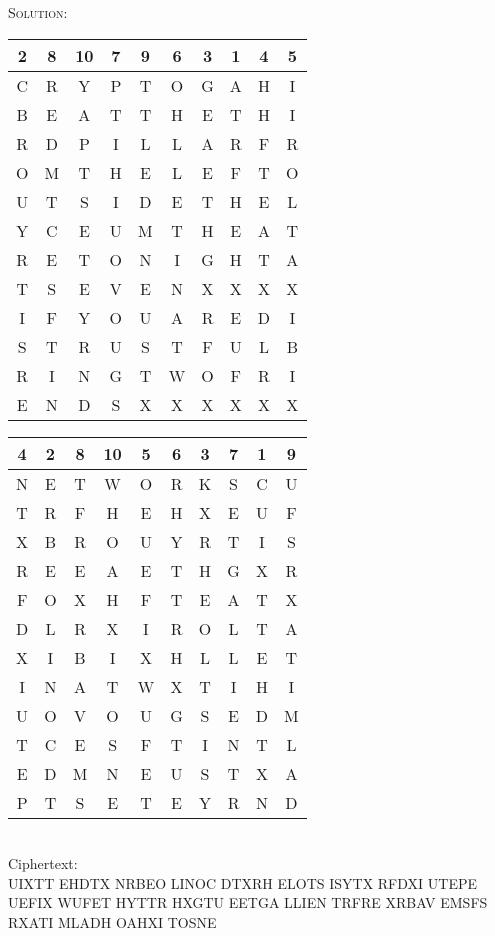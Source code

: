 \documentclass[12pt]{article}
\newenvironment{solution}
    {\textsc{Solution:}\\}
    {\newpage}%
\begin{document}
	\begin{solution}
		\begin{center}
			\begin{tabular}{|c|c|c|c|c|c|c|c|c|c|}
				\hline
				2 & 8 & 10 & 7 & 9 & 6 & 3 & 1 & 4 & 5 \\ \hline
				C & R & Y  & P & T & O & G & A & H & I \\ \hline
				B & E & A  & T & T & H & E & T & H & I \\
				R & D & P  & I & L & L & A & R & F & R \\
				O & M & T  & H & E & L & E & F & T & O \\
				U & T & S  & I & D & E & T & H & E & L \\
				Y & C & E  & U & M & T & H & E & A & T \\
				R & E & T  & O & N & I & G & H & T & A \\
				T & S & E  & V & E & N & X & X & X & X \\
				I & F & Y  & O & U & A & R & E & D & I \\
				S & T & R  & U & S & T & F & U & L & B \\
				R & I & N  & G & T & W & O & F & R & I \\
				E & N & D  & S & X & X & X & X & X & X \\ \hline
			\end{tabular}
			\quad
			\begin{tabular}{|c|c|c|c|c|c|c|c|c|c|}
				\hline
				4 & 2 & 8 & 10 & 5 & 6 & 3 & 7 & 1 & 9 \\ \hline
				N & E & T & W  & O & R & K & S & C & U \\ \hline
				T & R & F & H  & E & H & X & E & U & F \\
				X & B & R & O  & U & Y & R & T & I & S \\
				R & E & E & A  & E & T & H & G & X & R \\
				F & O & X & H  & F & T & E & A & T & X \\
				D & L & R & X  & I & R & O & L & T & A \\
				X & I & B & I  & X & H & L & L & E & T \\
				I & N & A & T  & W & X & T & I & H & I \\
				U & O & V & O  & U & G & S & E & D & M \\
				T & C & E & S  & F & T & I & N & T & L \\
				E & D & M & N  & E & U & S & T & X & A \\
				P & T & S & E  & T & E & Y & R & N & D \\ \hline
			\end{tabular}
			\\
			\vspace{10mm}
			Ciphertext:\\
			UIXTT EHDTX NRBEO LINOC DTXRH ELOTS ISYTX RFDXI UTEPE UEFIX WUFET
			HYTTR HXGTU EETGA LLIEN TRFRE XRBAV EMSFS RXATI MLADH OAHXI TOSNE
		\end{center}


\end{solution}
\end{document}

